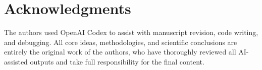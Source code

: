 \section*{Acknowledgments}
The authors used OpenAI Codex to assist with manuscript revision, code writing, and debugging. All core ideas, methodologies, and scientific conclusions are entirely the original work of the authors, who have thoroughly reviewed all AI-assisted outputs and take full responsibility for the final content.
